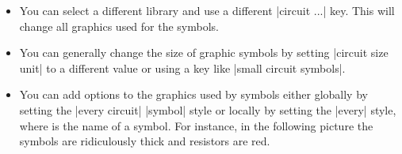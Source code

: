 \begin{itemize}
\item You can select a different library and use a different
  |circuit ...| key. This will change all graphics used for the
  symbols.
\item You can generally change the size of graphic symbols by setting
  |circuit size unit| to a different value or using a key like
  |small circuit symbols|.
\item
  You can add options to the graphics used by symbols either globally
  by setting the |every circuit| |symbol| style or locally by setting the
  |every|  style, where  is the name of a
  symbol. For instance, in the following picture the symbols are
  ridiculously thick and resistors are red.
\begin{codeexample}[]
\begin{tikzpicture}
  [circuit ee IEC,
   every circuit symbol/.style={ultra thick},
   every resistor/.style={red}]


\end{tikzpicture}
\end{codeexample}
\end{itemize}

